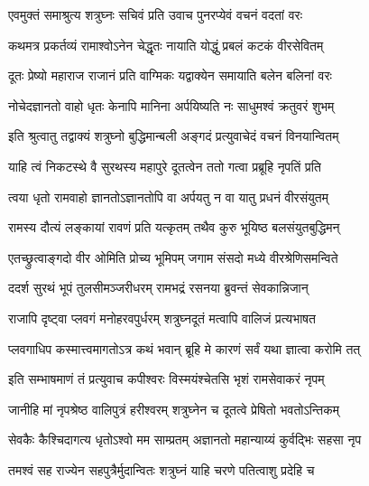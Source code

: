 \twolineshloka
{एवमुक्तं समाश्रुत्य शत्रुघ्नः सचिवं प्रति}
{उवाच पुनरप्येवं वचनं वदतां वरः}%


\twolineshloka
{कथमत्र प्रकर्तव्यं रामाश्वोऽनेन चेद्धृतः}
{नायाति योद्धुं प्रबलं कटकं वीरसेवितम्}%


\twolineshloka
{दूतः प्रेष्यो महाराज राजानं प्रति वाग्मिकः}
{यद्वाक्येन समायाति बलेन बलिनां वरः}%

\twolineshloka
{नोचेदज्ञानतो वाहो धृतः केनापि मानिना}
{अर्पयिष्यति नः साधुमश्वं क्रतुवरं शुभम्}%

\twolineshloka
{इति श्रुत्वातु तद्वाक्यं शत्रुघ्नो बुद्धिमान्बली}
{अङ्गदं प्रत्युवाचेदं वचनं विनयान्वितम्}%


\twolineshloka
{याहि त्वं निकटस्थे वै सुरथस्य महापुरे}
{दूतत्वेन ततो गत्वा प्रब्रूहि नृपतिं प्रति}%

\twolineshloka
{त्वया धृतो रामवाहो ज्ञानतोऽज्ञानतोपि वा}
{अर्पयतु न वा यातु प्रधनं वीरसंयुतम्}%

\twolineshloka
{रामस्य दौत्यं लङ्कायां रावणं प्रति यत्कृतम्}
{तथैव कुरु भूयिष्ठ बलसंयुतबुद्धिमन्}%


\twolineshloka
{एतच्छ्रुत्वाङ्गदो वीर ओमिति प्रोच्य भूमिपम्}
{जगाम संसदो मध्ये वीरश्रेणिसमन्विते}%

\twolineshloka
{ददर्श सुरथं भूपं तुलसीमञ्जरीधरम्}
{रामभद्रं रसनया ब्रुवन्तं सेवकान्निजान्}%

\twolineshloka
{राजापि दृष्ट्वा प्लवगं मनोहरवपुर्धरम्}
{शत्रुघ्नदूतं मत्वापि वालिजं प्रत्यभाषत}%


\twolineshloka
{प्लवगाधिप कस्मात्त्वमागतोऽत्र कथं भवान्}
{ब्रूहि मे कारणं सर्वं यथा ज्ञात्वा करोमि तत्}%


\twolineshloka
{इति सम्भाषमाणं तं प्रत्युवाच कपीश्वरः}
{विस्मयंश्चेतसि भृशं रामसेवाकरं नृपम्}%

\twolineshloka
{जानीहि मां नृपश्रेष्ठ वालिपुत्रं हरीश्वरम्}
{शत्रुघ्नेन च दूतत्वे प्रेषितो भवतोऽन्तिकम्}%

\twolineshloka
{सेवकैः कैश्चिदागत्य धृतोऽश्वो मम साम्प्रतम्}
{अज्ञानतो महान्याय्यं कुर्वद्भिः सहसा नृप}%

\twolineshloka
{तमश्वं सह राज्येन सहपुत्रैर्मुदान्वितः}
{शत्रुघ्नं याहि चरणे पतित्वाशु प्रदेहि च}%

